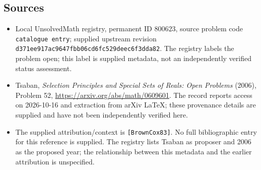 \documentclass[11pt]{article}
\begin{document}
\subsection{Sources}
\begin{itemize}
\item Local UnsolvedMath registry, permanent ID \(800623\), source problem code \texttt{catalogue entry}; supplied upstream revision \texttt{d371ee917ac9647fbb06cd6fc529deec6f3dda82}. The registry labels the problem open; this label is supplied metadata, not an independently verified status assessment.
\item Tsaban, \emph{Selection Principles and Special Sets of Reals: Open Problems} (2006), Problem 52, \url{https://arxiv.org/abs/math/0609601}. The record reports access on 2026-10-16 and extraction from arXiv LaTeX; these provenance details are supplied and have not been independently verified here.
\item The supplied attribution/context is \texttt{[BrownCox83]}. No full bibliographic entry for this reference is supplied. The registry lists Tsaban as proposer and 2006 as the proposed year; the relationship between this metadata and the earlier attribution is unspecified.
\end{itemize}
\end{document}
